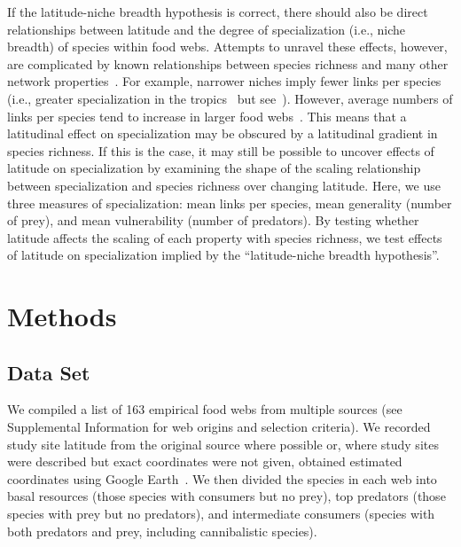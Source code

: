 \documentclass[12pt]{article}
\begin{document}
  If the latitude-niche breadth hypothesis is correct, there should also be direct relationships between latitude and the
  degree of specialization (i.e., niche breadth) of species within food webs.
  Attempts to unravel these effects, however,
  are complicated by known relationships between species richness and many other network properties~\citep{Riede2010}. 
  For example,
  narrower niches imply fewer links per species (i.e., greater specialization in the tropics~\citep{Dyer2007,Marra1997} but see~\citep{Schleuning2012}). However,
  average numbers of links per species tend to increase in larger food webs~\citep{Dunne2006,Riede2010}. This means
  that a latitudinal effect on specialization may be obscured by a latitudinal gradient in species richness. If this is
  the case, it may still be possible to uncover effects of latitude on specialization by examining the shape of the scaling 
  relationship between specialization and species richness over changing latitude. Here, we use three measures of specialization:
  mean links per species, mean generality (number of prey), and mean vulnerability (number of predators). By testing whether
  latitude affects the scaling of each property with species richness, we test effects of latitude on specialization implied by
  the ``latitude-niche breadth hypothesis''.



\section*{Methods}

\subsection*{Data Set} 

  We compiled a list of 163 empirical food webs from
  multiple sources (see Supplemental Information for web origins and selection
  criteria). We recorded study site latitude from the original source where
  possible or, where study sites were described but exact coordinates were not
  given, obtained estimated coordinates using Google Earth~\citep{GoogleEarth}.
  We then divided the species in each web into basal resources (those species with
  consumers but no prey), top predators (those species with prey but no predators),
  and intermediate consumers (species with both predators and prey, including cannibalistic
  species). 
\end{document}
